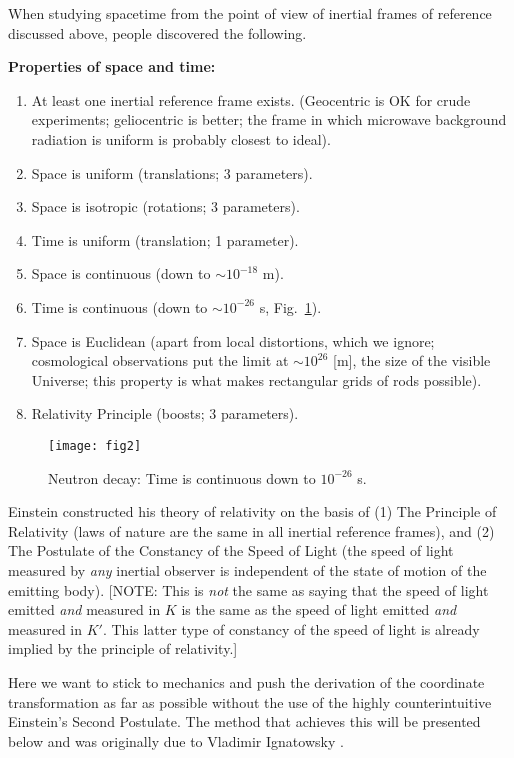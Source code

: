 \documentclass[twocolumn,preprintnumbers,amsmath,amssymb,final]{revtex4}
\begin{document}
\vskip10pt 

When studying spacetime from the point of view of inertial frames of reference discussed above, 
people discovered the following.

\vskip10pt 

{\bf Properties of space and time:}
\begin{enumerate}
\item At least one inertial reference frame exists. 
(Geocentric is OK for crude experiments; geliocentric is better; the frame in which 
microwave background radiation is uniform is probably closest to ideal).
\item Space is uniform (translations; 3 parameters).
\item Space is isotropic (rotations; 3 parameters).
\item Time is uniform (translation; 1 parameter).
\item Space is continuous (down to $\sim 10^{-18}$ m).
\item Time is continuous (down to $\sim 10^{-26}$ s, Fig.\ \ref{fig:2}).
\item Space is Euclidean (apart from local distortions, which we ignore; 
cosmological observations put the limit at $\sim 10^{26}$ [m], the size of the visible 
Universe; this property is what makes rectangular grids of rods possible).
\item Relativity Principle (boosts; 3 parameters).
\end{enumerate} 

\begin{figure}[!ht]
\texttt{[image: fig2]}
\caption{ \label{fig:2} 
Neutron decay: Time is continuous down to $10^{-26}$ s.
}
\end{figure}

Einstein constructed his theory of relativity on the basis of (1) The Principle of Relativity 
(laws of nature are the same in all inertial reference frames), and (2) The Postulate of 
the Constancy of the Speed of Light (the speed of light measured by {\it any} inertial 
observer is independent of the state of motion of the emitting body). 
[NOTE: This is {\it not} the same as saying that the speed of light emitted {\it and} 
measured in $K$ is the same as the speed of light emitted {\it and} measured 
in $K'$. This latter type of constancy of the speed of light is already implied by 
the principle of relativity.]

Here we want to stick to mechanics and push the derivation of the coordinate transformation
as far as possible without the use of the highly counterintuitive Einstein's Second Postulate. 
The method that achieves this will be presented below and was originally due to 
Vladimir Ignatowsky \cite{Ignatowsky1911}. 
\end{document}
